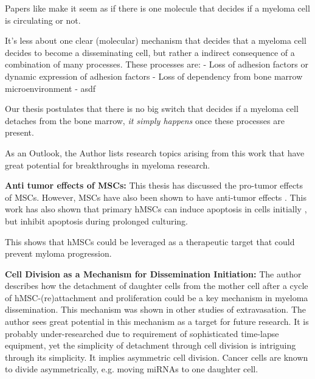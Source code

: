 Papers like \citet{akhmetzyanovaDynamicCD138Surface2020} make it seem as if
there is one molecule that decides if a myeloma cell is circulating or not.

It's less about one clear (molecular) mechanism that decides that a myeloma cell
decides to become a disseminating cell, but rather a indirect consequence of a combination of many
processes.
These processes are:
- Loss of adhesion factors or dynamic expression of adhesion factors
- Loss of dependency from bone marrow microenvironment
- asdf

Our thesis postulates that there is no big switch that decides if a myeloma cell
detaches from the bone marrow, \emph{it simply happens} once these processes are
present.


\label{sec:discussion_potential_breakthroughs}
As an Outlook, the Author lists research topics arising from this work that have
great potential for breakthroughs in myeloma research.

\textbf{Anti tumor effects of MSCs:}
This thesis has discussed the pro-tumor effects of MSCs. However, MSCs have also
been shown to have anti-tumor effects \cite{galderisiMyelomaCellsCan2015}. This
work has also shown that primary \acp{hMSC} can induce apoptosis in  cells
initially ,
but inhibit apoptosis during prolonged culturing.

This shows that hMSCs could be leveraged
as a therapeutic target that could prevent myloma progression.




\textbf{Cell Division as a Mechanism for Dissemination Initiation:}
The author describes how the detachment of daughter cells from the mother cell
after a cycle of hMSC-(re)attachment and proliferation could be a key mechanism
in myeloma dissemination. This mechanism was shown in other studies of
extravasation. The author sees great potential in this mechanism as a target for
future research. It is probably under-researched due to requirement of
sophisticated time-lapse equipment, yet the simplicity of detachment through
cell division is intriguing through its simplicity. It implies asymmetric cell
division. Cancer cells are known to divide asymmetrically, e.g. moving miRNAs to
one daughter cell.


